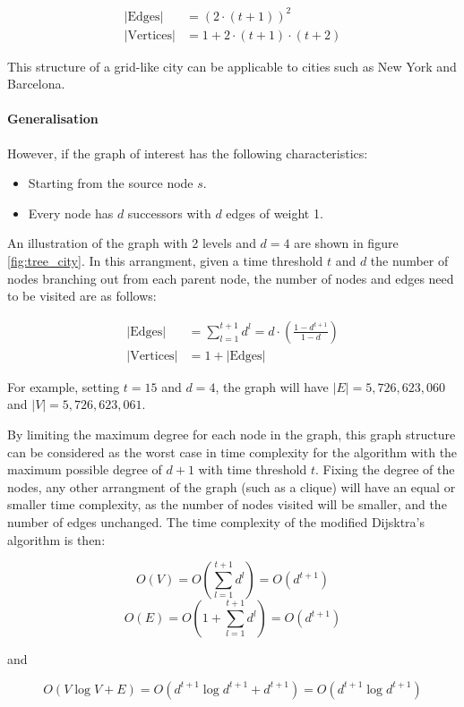 $$
\begin{aligned}
    |\text{Edges}|&=(2\cdot(t+1))^2\\
    |\text{Vertices}|&=1+2\cdot(t+1)\cdot(t+2)
\end{aligned}
$$

This structure of a grid-like city can be applicable to cities such as New York and Barcelona.

\paragraph{Generalisation}

However, if the graph of interest has the following characteristics:

\begin{itemize}
    \item Starting from the source node $s$.
    \item Every node has $d$ successors with $d$ edges of weight 1.
\end{itemize}

An illustration of the graph with 2 levels and $d = 4$ are shown in figure \ref{fig:tree_city}. In this arrangment, given a time threshold $t$ and $d$ the number of nodes branching out from each parent node, the number of nodes and edges need to be visited are as follows:

$$
\begin{aligned}
    |\text{Edges}|&=\sum_{l=1}^{t+1} d^l=d\cdot\left(\frac{1-d^{t+1}}{1-d}\right)\\
    |\text{Vertices}|&=1+|\text{Edges}|
\end{aligned}
$$

For example, setting $t=15$ and $d=4$, the graph will have $|E|=5,726,623,060$ and $|V|=5,726,623,061$.

By limiting the maximum degree for each node in the graph, this graph structure can be considered as the worst case in time complexity for the algorithm with the maximum possible degree of $d+1$ with time threshold $t$. Fixing the degree of the nodes, any other arrangment of the graph (such as a clique) will have an equal or smaller time complexity, as the number of nodes visited will be smaller, and the number of edges unchanged. The time complexity of the modified Dijsktra's algorithm is then:

$$O(V)=O(\sum_{l=1}^{t+1} d^l)=O(d^{t+1})$$
$$O(E)=O(1+\sum_{l=1}^{t+1} d^l)=O(d^{t+1})$$

and

$$O(V\log V+E)=O(d^{t+1}\log d^{t+1}+d^{t+1})=O(d^{t+1}\log d^{t+1})$$

